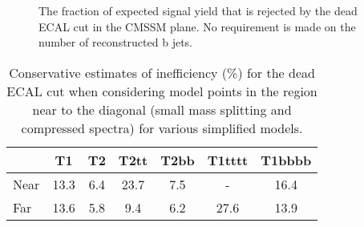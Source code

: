 \begin{figure}[h!]
  \begin{center}
     \\
     \\
    \caption{\label{fig:cmssm-dead-ecal}The fraction of expected signal
      yield that is rejected by the dead ECAL cut in the CMSSM
      plane. No requirement is made on the number of reconstructed
      b jets. }
  \end{center}
\end{figure}

\begin{table}[h!]
  \caption{Conservative estimates of inefficiency (\%) for
    the dead ECAL cut when considering model points in the
    region near to the diagonal (\ie small mass splitting and
    compressed spectra) for various simplified models.} 
  \label{tab:sms-dead-ecal-ineff}
  \centering
  \footnotesize
  \begin{tabular}{ lcccccc }
    \hline
         & T1   & T2  & T2tt & T2bb & T1tttt & T1bbbb \\ [0.5ex]
    \hline  
    Near & 13.3 & 6.4 & 23.7 & 7.5  & -      & 16.4   \\
    Far  & 13.6 & 5.8 & 9.4  & 6.2  & 27.6   & 13.9   \\
    \hline
  \end{tabular}
\end{table}

